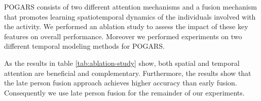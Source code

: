 \documentclass[a4paper,fleqn]{cas-dc}
\begin{document}
\begin{table}[pos=t]
  \caption{Comparison of different settings of the POGARS evaluated on Volleyball dataset.}
  \label{tab:ablation-study}
\end{table}

POGARS consists of two different attention mechanisms and a fusion mechanism that promotes learning spatiotemporal dynamics of the individuals involved with the activity. 
We performed an ablation study to assess the impact of these key features on overall performance. 
Moreover we performed experiments on two different temporal modeling methods for POGARS.

As the results in table \ref{tab:ablation-study} show, both spatial and temporal attention are beneficial and complementary. 
Furthermore, the results show that the late person fusion approach achieves higher accuracy than early fusion. 
Consequently we use late person fusion for the remainder of our experiments.
\end{document}
